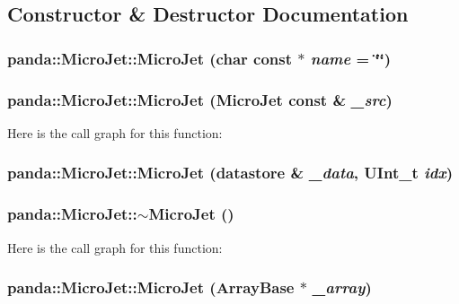 \subsection{Constructor \& Destructor Documentation}
\hypertarget{classpanda_1_1MicroJet_a1abdfc0209789587820ecd057a7a36e4}{
\subsubsection[{MicroJet}]{\setlength{\rightskip}{0pt plus 5cm}panda::MicroJet::MicroJet (char const $\ast$ {\em name} = {\ttfamily \char`\"{}\char`\"{}})}}
\label{classpanda_1_1MicroJet_a1abdfc0209789587820ecd057a7a36e4}
\hypertarget{classpanda_1_1MicroJet_a9027aa20ca61362ba328071c95925888}{
\subsubsection[{MicroJet}]{\setlength{\rightskip}{0pt plus 5cm}panda::MicroJet::MicroJet ({\bf MicroJet} const \& {\em \_\-src})}}
\label{classpanda_1_1MicroJet_a9027aa20ca61362ba328071c95925888}


Here is the call graph for this function:\hypertarget{classpanda_1_1MicroJet_abe4a87ea87f3975a2feee775051cf0d6}{
\subsubsection[{MicroJet}]{\setlength{\rightskip}{0pt plus 5cm}panda::MicroJet::MicroJet ({\bf datastore} \& {\em \_\-data}, \/  UInt\_\-t {\em idx})}}
\label{classpanda_1_1MicroJet_abe4a87ea87f3975a2feee775051cf0d6}
\hypertarget{classpanda_1_1MicroJet_abe6a12070108df200cb5f8011fc8bbca}{
\subsubsection[{$\sim$MicroJet}]{\setlength{\rightskip}{0pt plus 5cm}panda::MicroJet::$\sim$MicroJet ()}}
\label{classpanda_1_1MicroJet_abe6a12070108df200cb5f8011fc8bbca}


Here is the call graph for this function:\hypertarget{classpanda_1_1MicroJet_a5c8d4adb3eb683f32bc36a17fb1dc8cc}{
\subsubsection[{MicroJet}]{\setlength{\rightskip}{0pt plus 5cm}panda::MicroJet::MicroJet ({\bf ArrayBase} $\ast$ {\em \_\-array})}}
\label{classpanda_1_1MicroJet_a5c8d4adb3eb683f32bc36a17fb1dc8cc}


